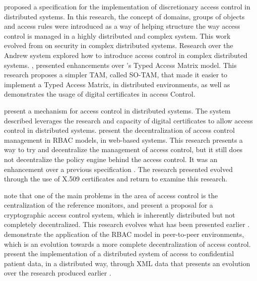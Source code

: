 \citeauthor{moffett_specifying_1990} \cite{moffett_specifying_1990} proposed a specification for the implementation of discretionary
access control in distributed systems. In this research, the concept of domains, groups of objects and
access rules were introduced as a way of helping structure the way access control is managed in a highly
distributed and complex system. This work evolved from \citeauthor{satyanarayanan_integrating_1989} \cite{satyanarayanan_integrating_1989} on security in complex distributed systems. Research over the Andrew system \cite{satyanarayanan_integrating_1989} explored how to introduce access control in complex distributed systems.\citeauthor{sandhu_implementation_1992} \cite{sandhu_implementation_1992}, presented enhancements over  \citeauthor{sandhu_typed_1992}’s \cite{sandhu_typed_1992} Typed Access Matrix model. This research proposes a simpler TAM, called SO-TAM, that made it easier to implement a Typed Access Matrix, in distributed environments, as well as demonstrates the usage of digital certificates in access Control.

\citeauthor{johnston_authorization_1998} \cite{johnston_authorization_1998} present a mechanism for access control in distributed
systems. The system described leverages the research and capacity of digital certificates to allow access
control in distributed systems. \citeauthor{sandhu_decentralized_1998} \cite{sandhu_decentralized_1998} present the decentralization of access control management in RBAC models, in web-based systems. This research presents a way to try and decentralize the management of access control, but it still does not decentralize the policy engine behind the access control. It was an enhancement over a previous specification \cite{barkley_role_1997}. The research presented \cite{sandhu_decentralized_1998} evolved through the use of X.509 certificates \cite{park_smart_1999} and \citeauthor{park_role-based_2001} \cite{park_role-based_2001} return to examine this research.

\citeauthor{harrington_cryptographic_2003} \cite{harrington_cryptographic_2003} note that one of the main problems in the area of access control is the centralization of the reference monitors, and present a proposal for a cryptographic access control system, which is inherently distributed but not completely decentralized. This research evolves what has been presented earlier \cite{satyanarayanan_integrating_1989}. \citeauthor{park_role-based_2003} \cite{park_role-based_2003} demonstrate the application of the RBAC model in peer-to-peer environments, which is an evolution towards a more complete decentralization of access control. \citeauthor{abiteboul_electronic_2004} \cite{abiteboul_electronic_2004} present the implementation of a distributed system of access to confidential patient data, in a distributed way, through XML data that presents an evolution over the research produced earlier \cite{damiani_fine-grained_2002}.

